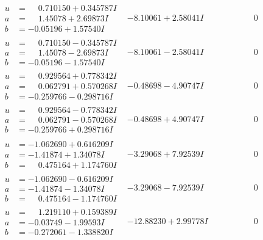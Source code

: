 \documentclass[1p]{elsarticle_modified}
\theoremstyle{definition}
\begin{document}
$$\begin{array}{c|c|c}
\begin{aligned}
u &= \phantom{-}0.710150 + 0.345787 I \\
a &= \phantom{-}1.45078 + 2.69873 I \\
b &= -0.05196 + 1.57540 I\end{aligned}
 & -8.10061 + 2.58041 I & \phantom{-0.000000 } 0 \\ \hline\begin{aligned}
u &= \phantom{-}0.710150 - 0.345787 I \\
a &= \phantom{-}1.45078 - 2.69873 I \\
b &= -0.05196 - 1.57540 I\end{aligned}
 & -8.10061 - 2.58041 I & \phantom{-0.000000 } 0 \\ \hline\begin{aligned}
u &= \phantom{-}0.929564 + 0.778342 I \\
a &= \phantom{-}0.062791 + 0.570268 I \\
b &= -0.259766 - 0.298716 I\end{aligned}
 & -0.48698 - 4.90747 I & \phantom{-0.000000 } 0 \\ \hline\begin{aligned}
u &= \phantom{-}0.929564 - 0.778342 I \\
a &= \phantom{-}0.062791 - 0.570268 I \\
b &= -0.259766 + 0.298716 I\end{aligned}
 & -0.48698 + 4.90747 I & \phantom{-0.000000 } 0 \\ \hline\begin{aligned}
u &= -1.062690 + 0.616209 I \\
a &= -1.41874 + 1.34078 I \\
b &= \phantom{-}0.475164 + 1.174760 I\end{aligned}
 & -3.29068 + 7.92539 I & \phantom{-0.000000 } 0 \\ \hline\begin{aligned}
u &= -1.062690 - 0.616209 I \\
a &= -1.41874 - 1.34078 I \\
b &= \phantom{-}0.475164 - 1.174760 I\end{aligned}
 & -3.29068 - 7.92539 I & \phantom{-0.000000 } 0 \\ \hline\begin{aligned}
u &= \phantom{-}1.219110 + 0.159389 I \\
a &= -0.03749 - 1.99593 I \\
b &= -0.272061 - 1.338820 I\end{aligned}
 & -12.88230 + 2.99778 I & \phantom{-0.000000 } 0 \\ \hline\begin{aligned}

\end{aligned}
\end{array}$$
\end{document}
